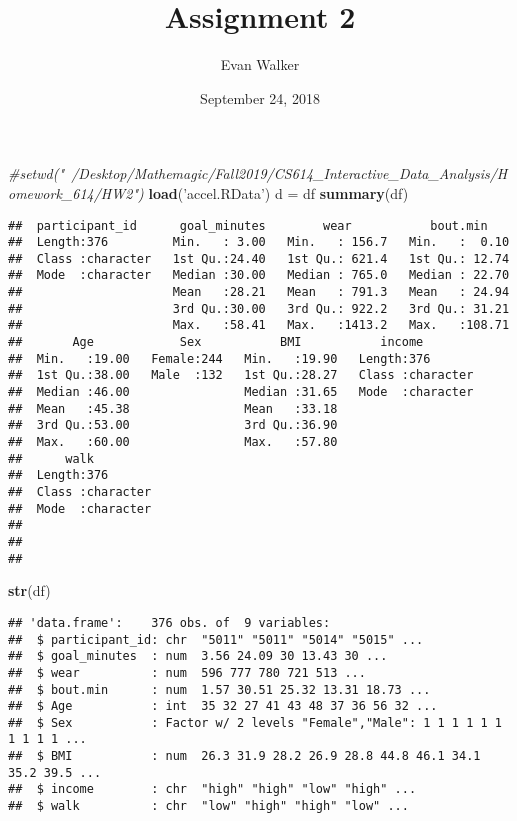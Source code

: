\documentclass[]{article}
\title{Assignment 2}
\author{Evan Walker}
\date{September 24, 2018}
\newenvironment{Shaded}{\begin{snugshade}}{\end{snugshade}}
\newcommand{\KeywordTok}[1]{\textcolor[rgb]{0.13,0.29,0.53}{\textbf{#1}}}
\newcommand{\StringTok}[1]{\textcolor[rgb]{0.31,0.60,0.02}{#1}}
\newcommand{\CommentTok}[1]{\textcolor[rgb]{0.56,0.35,0.01}{\textit{#1}}}
\newcommand{\NormalTok}[1]{#1}
\begin{document}
\maketitle

\begin{Shaded}
\begin{Highlighting}[]
\CommentTok{#setwd("~/Desktop/Mathemagic/Fall2019/CS614_Interactive_Data_Analysis/Homework_614/HW2")}
\KeywordTok{load}\NormalTok{(}\StringTok{'accel.RData'}\NormalTok{)}
\NormalTok{d =}\StringTok{ }\NormalTok{df}
\KeywordTok{summary}\NormalTok{(df)}
\end{Highlighting}
\end{Shaded}

\begin{verbatim}
##  participant_id      goal_minutes        wear           bout.min     
##  Length:376         Min.   : 3.00   Min.   : 156.7   Min.   :  0.10  
##  Class :character   1st Qu.:24.40   1st Qu.: 621.4   1st Qu.: 12.74  
##  Mode  :character   Median :30.00   Median : 765.0   Median : 22.70  
##                     Mean   :28.21   Mean   : 791.3   Mean   : 24.94  
##                     3rd Qu.:30.00   3rd Qu.: 922.2   3rd Qu.: 31.21  
##                     Max.   :58.41   Max.   :1413.2   Max.   :108.71  
##       Age            Sex           BMI           income         
##  Min.   :19.00   Female:244   Min.   :19.90   Length:376        
##  1st Qu.:38.00   Male  :132   1st Qu.:28.27   Class :character  
##  Median :46.00                Median :31.65   Mode  :character  
##  Mean   :45.38                Mean   :33.18                     
##  3rd Qu.:53.00                3rd Qu.:36.90                     
##  Max.   :60.00                Max.   :57.80                     
##      walk          
##  Length:376        
##  Class :character  
##  Mode  :character  
##                    
##                    
## 
\end{verbatim}

\begin{Shaded}
\begin{Highlighting}[]
\KeywordTok{str}\NormalTok{(df)}
\end{Highlighting}
\end{Shaded}

\begin{verbatim}
## 'data.frame':    376 obs. of  9 variables:
##  $ participant_id: chr  "5011" "5011" "5014" "5015" ...
##  $ goal_minutes  : num  3.56 24.09 30 13.43 30 ...
##  $ wear          : num  596 777 780 721 513 ...
##  $ bout.min      : num  1.57 30.51 25.32 13.31 18.73 ...
##  $ Age           : int  35 32 27 41 43 48 37 36 56 32 ...
##  $ Sex           : Factor w/ 2 levels "Female","Male": 1 1 1 1 1 1 1 1 1 1 ...
##  $ BMI           : num  26.3 31.9 28.2 26.9 28.8 44.8 46.1 34.1 35.2 39.5 ...
##  $ income        : chr  "high" "high" "low" "high" ...
##  $ walk          : chr  "low" "high" "high" "low" ...
\end{verbatim}
\end{document}
